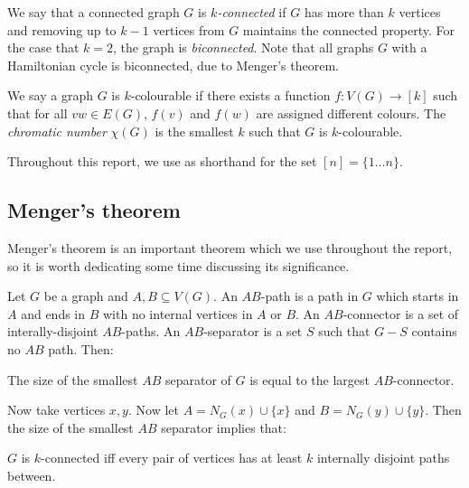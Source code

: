We say that a connected graph \(G\) is \textit{\(k\)-connected} if \(G\) has more than \(k\) vertices and removing up to \(k-1\) vertices from \(G\) maintains the connected property. For the case that \(k = 2\), the graph is \textit{biconnected}. Note that all graphs \(G\) with a Hamiltonian cycle is biconnected, due to Menger's theorem.\cite{mengerZurAllgemeinenKurventheorie1927a}

We say a graph \(G\) is \(k\)-colourable if there exists a function \(f: V(G) \rightarrow [k]\) such that for all \(vw \in E(G)\), \(f(v)\) and \(f(w)\) are assigned different colours. The \textit{chromatic number} \(\chi(G)\) is the smallest \(k\) such that \(G\) is \(k\)-colourable. 

Throughout this report, we use as shorthand for the set \( [n] = \lbrace 1\ldots n \rbrace \). 

\subsection{Menger's theorem}
Menger's theorem is an important theorem which we use throughout the report, so it is worth dedicating some time discussing its significance.

Let \(G\) be a graph and \(A, B \subseteq V(G)\). An \(AB\)-path is a path in \(G\) which starts in \(A\) and ends in \(B\) with no internal vertices in \(A\) or \(B\). An \(AB\)-connector is a set of interally-disjoint \(AB\)-paths. An \(AB\)-separator is a set \(S\) such that \(G - S\) contains no \(AB\) path. Then:

\begin{theorem}\label{thm:Menger}
	The size of the smallest \(AB\) separator of \(G\) is equal to the largest \(AB\)-connector. 
\end{theorem}

Now take vertices \(x, y\). Now let \(A = N_G(x) \cup \{x\} \) and \(B = N_G(y) \cup \{y\} \). Then the size of the smallest \(AB\) separator implies that:
\begin{theorem}\label{thm:Menger_Vertex}
	\(G\) is \(k\)-connected iff every pair of vertices has at least \(k\) internally disjoint paths between. 
\end{theorem}

